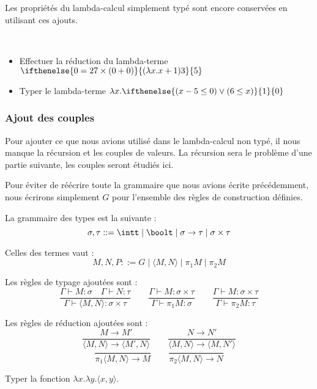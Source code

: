 Les propriétés du lambda-calcul simplement typé sont encore conservées en utilisant ces ajouts.

\begin{exo}
    \ 
    \begin{itemize}[label=$\bullet$]
        \item Effectuer la réduction du lambda-terme $\ifthenelse{0=27\times (0+0)}{(\lambda x.x+1) 3}{5}$
        \item Typer le lambda-terme $\lambda x. \ifthenelse{(x-5 \leq 0)\lor (6\leq x)}{1}{0}$
    \end{itemize}
\end{exo}

\subsubsection{Ajout des couples}

Pour ajouter ce que nous avions utilisé dans le lambda-calcul non typé, il nous manque la récursion et les couples de valeurs. La récursion sera le problème d'une partie suivante, les couples seront étudiés ici.

Pour éviter de réécrire toute la grammaire que nous avions écrite précédemment, nous écrirons simplement $G$ pour l'ensemble des règles de construction définies.

\begin{defi}
    La grammaire des types est la suivante :
    $$\sigma,\tau ::= \intt\mid\boolt\mid\sigma\to\tau\mid\sigma\times\tau$$
    
    Celles des termes vaut :
    $$M,N,P ::= G \mid \langle M,N\rangle\mid \pi_1 M\mid\pi_2 M$$
\end{defi}

\begin{defi}[Typage]
    Les règles de typage ajoutées sont :
    $$\dfrac{\Gamma\vdash M : \sigma\quad\Gamma\vdash N : \tau}{\Gamma\vdash \langle M,N\rangle : \sigma\times \tau}\qquad\dfrac{\Gamma\vdash M : \sigma\times\tau}{\Gamma\vdash \pi_1 M : \sigma}\qquad\dfrac{\Gamma\vdash M : \sigma\times \tau}{\Gamma\vdash \pi_2 M : \tau}$$
\end{defi}

\begin{defi}[Réduction]
    Les règles de réduction ajoutées sont :
    $$\dfrac{M\to M'}{\langle M,N\rangle\to\langle M',N\rangle}\qquad\dfrac{N\to N'}{\langle M,N\rangle\to\langle M,N'\rangle}$$
    $$\dfrac{}{\pi_1\langle M,N\rangle \to M}\qquad \dfrac{}{\pi_2\langle M,N\rangle \to N}$$
\end{defi}

\begin{exo}
    Typer la fonction $\lambda x.\lambda y.\langle x,y\rangle$.
\end{exo}

\newpage